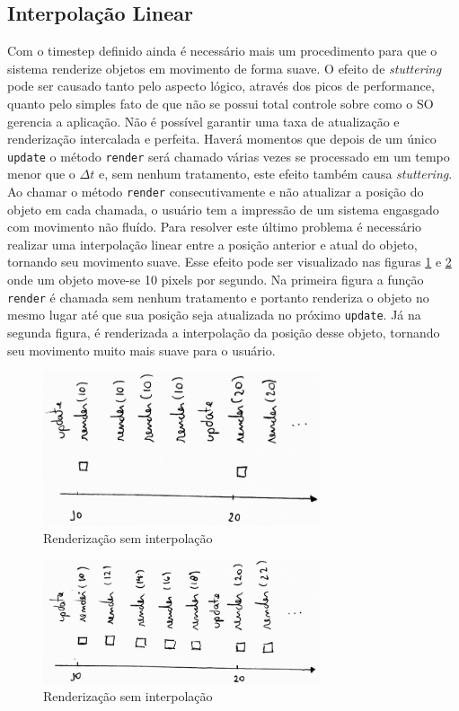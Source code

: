 \documentclass[12pt, 
openright, 
oneside, 
a4paper,    
brazil]{facom-ufu-abntex2}
\begin{document}
\subsection{Interpolação Linear} 
\label{subsec:interpoLinear}
Com o timestep definido ainda é necessário mais um procedimento para que o sistema renderize objetos em movimento de forma suave. O efeito de \textit{stuttering} pode ser causado tanto pelo aspecto lógico, através dos picos de performance, quanto pelo simples fato de que não se possui total controle sobre como o SO gerencia a aplicação. Não é possível garantir uma taxa de atualização e renderização intercalada e perfeita. Haverá momentos que depois de um único \texttt{update} o método \texttt{render} será chamado várias vezes se processado em um tempo menor que o $\Delta t$ e, sem nenhum tratamento, este efeito também causa \textit{stuttering}. Ao chamar o método \texttt{render} consecutivamente e não atualizar a posição do objeto em cada chamada, o usuário tem a impressão de um sistema engasgado com movimento não fluído.
Para resolver este último problema é necessário realizar uma interpolação linear entre a posição anterior e atual do objeto, tornando seu movimento suave. Esse efeito pode ser visualizado nas figuras \ref{fig:renderSemInterpolacao} e \ref{fig:renderComInterpolacao} onde um objeto move-se 10 pixels por segundo. Na primeira figura a função \texttt{render} é chamada sem nenhum tratamento e portanto renderiza o objeto no mesmo lugar até que sua posição seja atualizada no próximo \texttt{update}. Já na segunda figura, é renderizada a interpolação da posição desse objeto, tornando seu movimento muito mais suave para o usuário.
\begin{figure}[H]
	\centering
	\includegraphics[width=22em]{imagens/ilu7_small.png}
	\caption{Renderização sem interpolação
	\label{fig:renderSemInterpolacao}}
\end{figure}
\begin{figure}[H]
	\centering
	\includegraphics[width=22em]{imagens/ilu5_small.png}
	\caption{Renderização sem interpolação
	\label{fig:renderComInterpolacao}}
\end{figure}
\end{document}
